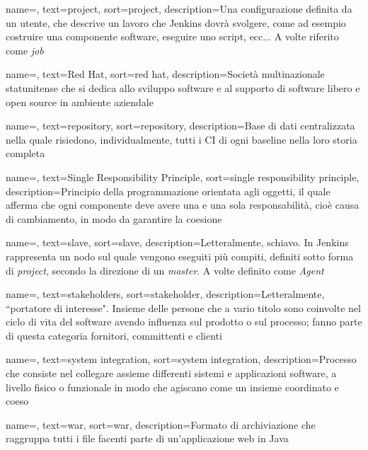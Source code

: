 {
    name=,
    text=project,
    sort=project,
    description={Una configurazione definita da un utente, che descrive un lavoro che Jenkins dovrà svolgere, come ad esempio costruire una componente software, eseguire uno script, ecc... A volte riferito come \textit{job}}
}

{
    name=,
    text=Red Hat,
    sort=red hat,
    description={Società multinazionale statunitense che si dedica allo sviluppo software e al supporto di software libero e open source in ambiente aziendale}
}

{
    name=,
    text=repository,
    sort=repository,
    description={Base di dati centralizzata nella quale risiedono, individualmente, tutti i \gls{CI} di ogni \gls{baseline} nella loro storia completa}
}

{
    name=,
    text=Single Responsibility Principle,
    sort=single responsibility principle,
    description={Principio della programmazione orientata agli oggetti, il quale afferma che ogni componente deve avere una e una sola responsabilità, cioè causa di cambiamento, in modo da garantire la coesione}
}

{
    name=,
    text=slave,
    sort=slave,
    description={Letteralmente, schiavo. In Jenkins rappresenta un nodo sul quale vengono eseguiti più compiti, definiti sotto forma di \textit{project}, secondo la direzione di un \textit{master}. A volte definito come \textit{Agent}}
}

{
    name=,
    text=stakeholders,
    sort=stakeholder,
    description={Letteralmente, ``portatore di interesse". Insieme delle persone che a vario titolo sono coinvolte nel ciclo di vita del software avendo influenza sul prodotto o sul processo; fanno parte di questa categoria fornitori, committenti e clienti}
}

{
    name=,
    text=system integration,
    sort=system integration,
    description={Processo che consiste nel collegare assieme differenti sistemi e applicazioni software, a livello fisico o funzionale in modo che agiscano come un insieme coordinato e coeso}
}

{
    name=,
    text=war,
    sort=war,
    description={Formato di archiviazione che raggruppa tutti i file facenti parte di un'applicazione web in Java}
}
